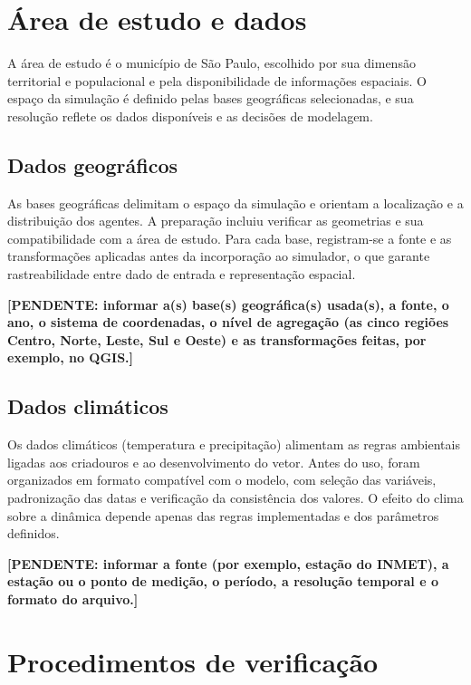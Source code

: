 \section{Área de estudo e dados}
\label{sec:dados}

A área de estudo é o município de São Paulo, escolhido por sua dimensão territorial e populacional e pela disponibilidade de informações espaciais. O espaço da simulação é definido pelas bases geográficas selecionadas, e sua resolução reflete os dados disponíveis e as decisões de modelagem.

\subsection{Dados geográficos}

As bases geográficas delimitam o espaço da simulação e orientam a localização e a distribuição dos agentes. A preparação incluiu verificar as geometrias e sua compatibilidade com a área de estudo. Para cada base, registram-se a fonte e as transformações aplicadas antes da incorporação ao simulador, o que garante rastreabilidade entre dado de entrada e representação espacial.

\textbf{[PENDENTE: informar a(s) base(s) geográfica(s) usada(s), a fonte, o ano, o sistema de coordenadas, o nível de agregação (as cinco regiões Centro, Norte, Leste, Sul e Oeste) e as transformações feitas, por exemplo, no QGIS.]}

\subsection{Dados climáticos}

Os dados climáticos (temperatura e precipitação) alimentam as regras ambientais ligadas aos criadouros e ao desenvolvimento do vetor. Antes do uso, foram organizados em formato compatível com o modelo, com seleção das variáveis, padronização das datas e verificação da consistência dos valores. O efeito do clima sobre a dinâmica depende apenas das regras implementadas e dos parâmetros definidos.

\textbf{[PENDENTE: informar a fonte (por exemplo, estação do INMET), a estação ou o ponto de medição, o período, a resolução temporal e o formato do arquivo.]}

\section{Procedimentos de verificação}


